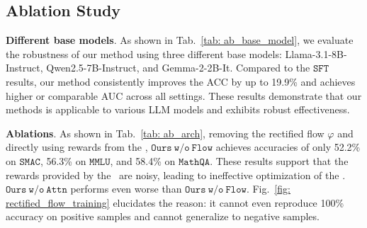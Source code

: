 % 
 
% 






\subsection{Ablation Study}
\textbf{Different base models}. As shown in Tab.~\ref{tab: ab_base_model}, we evaluate the robustness of our method using three different base models: Llama-3.1-8B-Instruct, Qwen2.5-7B-Instruct, and Gemma-2-2B-It. 
Compared to the ${\mathtt{SFT}}$ results, our method consistently improves the ACC by up to 19.9\% and achieves higher or comparable AUC across all settings. These results demonstrate that our methods is applicable to various LLM models and exhibits robust effectiveness. 


\textbf{Ablations}. As shown in Tab.~\ref{tab: ab_arch}, removing the rectified flow $\varphi$ and directly using rewards from the \rlm, $\mathtt{Ours \ w/o\ Flow}$ achieves accuracies of only 52.2\% on $\mathtt{SMAC}$, 56.3\% on $\mathtt{MMLU}$, and 58.4\% on $\mathtt{MathQA}$. These results support that the rewards provided by the \rlm~are noisy, leading to ineffective optimization of the \elm. $\mathtt{Ours\ w/o\ Attn}$ performs even worse than $\mathtt{Ours\ w/o\ Flow}$.  Fig.~\ref{fig: rectified_flow_training} elucidates the reason: it cannot even reproduce 100\% accuracy on positive samples and cannot generalize to negative samples.

%


